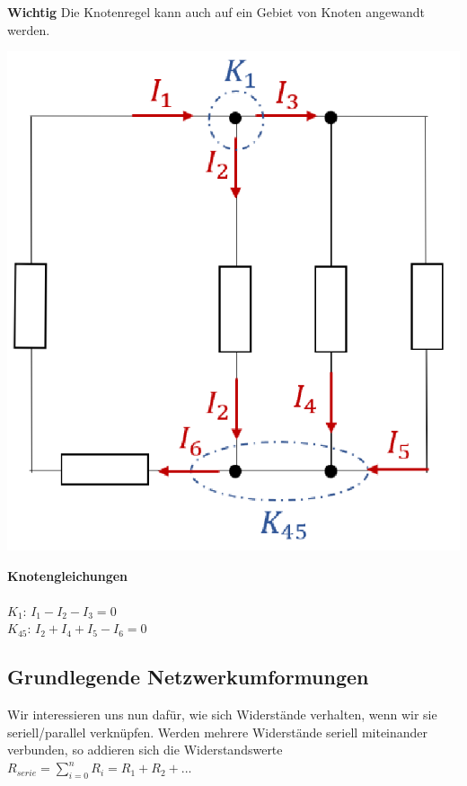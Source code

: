 										\textbf{Wichtig} Die Knotenregel kann auch auf ein Gebiet von Knoten angewandt werden. \\


										\begin{minipage}{0.6\textwidth}
										\begin{flushright}
												\includegraphics[scale=0.4]{img/knotengl.png}
											\end{flushright}
										\end{minipage}
										\begin{minipage}{0.4\textwidth}

											\textbf{Knotengleichungen} \\ \\
											$\displaystyle K_1$: $ I_1 - I_2 - I_3 = 0 $ \\
											$\displaystyle K_{45}$: $ I_2 + I_4 + I_5 - I_6 = 0 $ \\
										\end{minipage}


					\newpage

										\subsection{Grundlegende Netzwerkumformungen}
										Wir interessieren uns nun dafür, wie sich Widerstände verhalten, wenn wir sie seriell/parallel verknüpfen.
										\beginip
										Werden mehrere Widerstände seriell miteinander verbunden, so addieren sich die Widerstandswerte \\
										\formulaBegin
										$\displaystyle R_{serie} = \sum_{i=0}^n R_i = R_1 + R_2 + ...$
										\formulaEnd
										\iend

